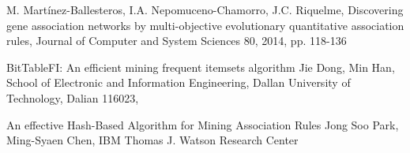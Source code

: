 \documentclass[12pt,spanish]{article}
\begin{document}
\begin{thebibliography}{9}

	M. Martínez-Ballesteros, I.A. Nepomuceno-Chamorro, J.C. Riquelme,
	Discovering gene association networks by multi-objective evolutionary quantitative association rules,
	Journal of Computer and System Sciences 80, 2014,
	pp. 118-136

	BitTableFI: An efficient mining frequent itemsets algorithm
	Jie Dong, Min Han,
	School of Electronic and Information Engineering, Dallan University of Technology, Dalian 116023,

	An effective Hash-Based Algorithm for Mining Association Rules
	Jong Soo Park, Ming-Syaen Chen,
	IBM Thomas J. Watson Research Center

\end{thebibliography}
\end{document}
